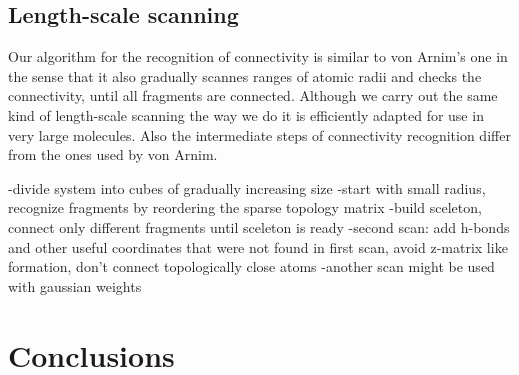 \documentclass[prl,aps,preprint,superbib,12pt]{revtex4}
\begin{document}
\subsection{Length-scale scanning}
Our algorithm for the recognition of connectivity is similar
to von Arnim's one in the sense that it also gradually scannes 
ranges of atomic radii and checks the connectivity, until all fragments
are connected. Although we carry out the same kind of length-scale
scanning the way we do it is efficiently adapted for use in very large
molecules. Also the intermediate steps of connectivity recognition
differ from the ones used by von Arnim.  

-divide system into cubes of gradually increasing size
-start with small radius, recognize fragments by reordering
the sparse topology matrix
-build sceleton, connect only different fragments until sceleton is ready
-second scan: add h-bonds and other useful coordinates that were not found in first scan, avoid z-matrix like formation, don't connect topologically close atoms
-another scan might be used with gaussian weights

\section{Conclusions} \label{Conclusions}


\end{document}
